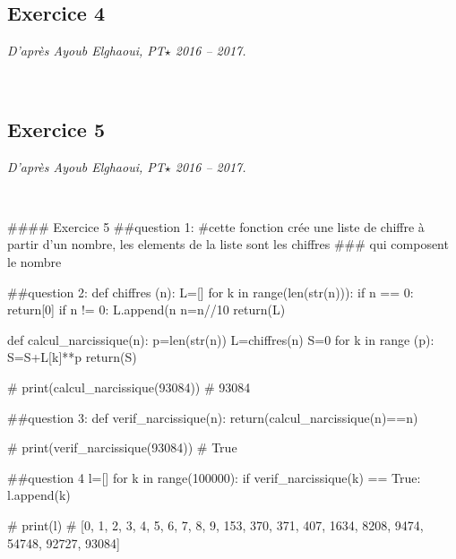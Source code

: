 \documentclass[10pt,fleqn]{article} %
\begin{document}
\subsection*{Exercice 4}
\textit{D'après Ayoub Elghaoui, PT$\star$ 2016 -- 2017.}
\begin{corrige}
$\quad$
\end{corrige}

\subsection*{Exercice 5}
\textit{D'après Ayoub Elghaoui, PT$\star$ 2016 -- 2017.}

\begin{corrige}
$\quad$
\begin{python}
#### Exercice 5
##question 1:
#cette fonction crée une liste de chiffre à partir d'un nombre, les elements de la liste sont les chiffres 
### qui composent le nombre

##question 2:
def chiffres (n):
    L=[]
    for k in range(len(str(n))):
        if n == 0:
            return[0]
        if n != 0:
            L.append(n%
            n=n//10
    return(L)

def calcul_narcissique(n):
    p=len(str(n))
    L=chiffres(n)
    S=0
    for k in range (p):
        S=S+L[k]**p 
    return(S)

# print(calcul_narcissique(93084))
# 93084

##question 3:
def verif_narcissique(n):
    return(calcul_narcissique(n)==n)
    
# print(verif_narcissique(93084))
# True

##question 4
l=[]
for k in range(100000):
    if verif_narcissique(k) == True:
        l.append(k)
    
# print(l)
# [0, 1, 2, 3, 4, 5, 6, 7, 8, 9, 153, 370, 371, 407, 1634, 8208, 9474, 54748, 92727, 93084]
\end{python}
\end{corrige}
\end{document}
